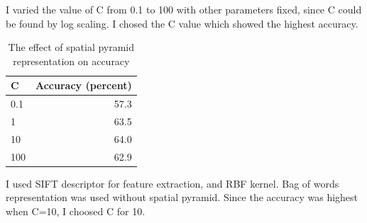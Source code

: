 I varied the value of C from 0.1 to 100 with other parameters fixed, since C could be found by log scaling. I chosed the C value which showed the highest accuracy.

\begin{table}[h]
    \centering
    \begin{tabular}{lr}
        \toprule
        C & Accuracy (percent) \\
        \midrule
        0.1 & 57.3 \\
        1 & 63.5 \\
        10 & 64.0 \\
        100 & 62.9 \\
        \bottomrule
    \end{tabular}
    \caption{The effect of spatial pyramid representation on accuracy}
\end{table}
I used SIFT descriptor for feature extraction, and RBF kernel. Bag of words representation was used without spatial pyramid.
Since the accuracy was highest when C=10, I choosed C for 10.
